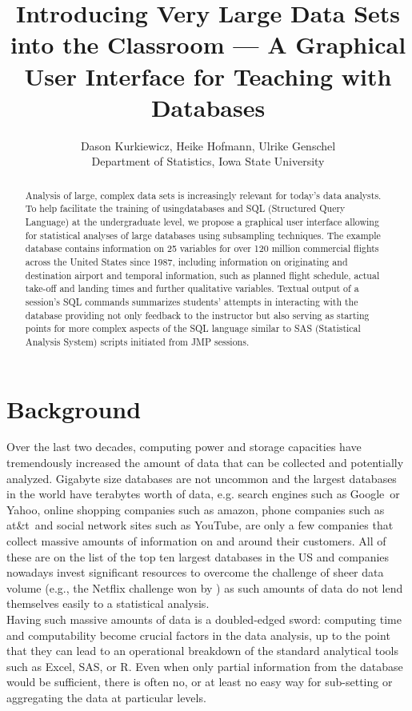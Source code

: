 \documentclass[11pt]{tise_style}
\author{Dason Kurkiewicz, Heike Hofmann, Ulrike Genschel\\Department of Statistics, Iowa State University}
\title{Introducing Very Large Data Sets into the Classroom --- A Graphical User Interface for Teaching with Databases}
\begin{document}
\begin{abstract}
Analysis of large, complex data sets is increasingly relevant for today's data analysts. To help facilitate the training of usingdatabases and SQL (Structured Query Language) at the undergraduate level, we propose a graphical user interface allowing for statistical analyses of large databases using subsampling techniques. The example database contains information on 25 variables for over 120 million commercial flights across the United States since 1987, including information on originating and destination airport and temporal information, such as planned flight schedule, actual take-off and landing times and further qualitative variables. Textual output of a session's SQL commands summarizes students' attempts in interacting with the database providing not only feedback to the instructor but also serving as starting points for more complex aspects of the SQL language similar to SAS (Statistical Analysis System) scripts initiated from JMP sessions.
\end{abstract}

\section{{Background}}
Over the last two decades, computing power and storage capacities have tremendously
increased the amount of data that can be collected and potentially analyzed. Gigabyte size databases are not uncommon and the largest databases in the world have terabytes worth of data, e.g.  search engines such as Google\texttrademark\  or  Yahoo\texttrademark, online shopping companies such as amazon\texttrademark, phone companies such as  at\&t\texttrademark\ and social network sites such as YouTube\texttrademark, are only a few companies that collect massive amounts of information on and around their customers. All of these are on the list of the top ten largest databases in the US \citep{topten} and companies nowadays invest significant resources to overcome the challenge of sheer data volume (e.g., the Netflix challenge won by \citet{netflix:2009})  as such amounts of data do not lend themselves easily to a statistical analysis. \\
Having such massive amounts of data is a doubled-edged sword: computing time and computability become crucial factors in the data analysis, up to the point that they can lead to an operational breakdown of the standard analytical tools such as Excel, SAS, or R. Even when only partial information from the database would be sufficient, there is often no, or at least no easy way for sub-setting or aggregating the data at particular levels.
\end{document}
